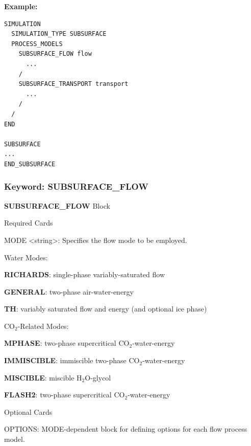\begin{mdframed}

{\bf Example:}
\footnotesize
\begin{verbatim}
SIMULATION
  SIMULATION_TYPE SUBSURFACE
  PROCESS_MODELS
    SUBSURFACE_FLOW flow
      ...
    /
    SUBSURFACE_TRANSPORT transport
      ...
    /
  /
END

SUBSURFACE
...
END_SUBSURFACE

\end{verbatim}
\end{mdframed}
\normalsize

\newpage
\subsubsection{Keyword: SUBSURFACE\_FLOW}
\begin{description}
\item {\bf SUBSURFACE\_FLOW} Block

\begin{description}
\item Required Cards
\item MODE <string>: Specifies the flow mode to be employed. 
\end{description}

\item Water Modes:

\begin{description}
\item {\bf RICHARDS}: single-phase variably-saturated flow
\item {\bf GENERAL}: two-phase air-water-energy
\item {\bf TH}: variably saturated flow and energy (and optional ice phase)
\end{description}

\item CO$_2$-Related Modes:

\begin{description}
\item {\bf MPHASE}: two-phase supercritical CO$_2$-water-energy
\item {\bf IMMISCIBLE}: immiscible two-phase CO$_2$-water-energy
\item {\bf MISCIBLE}: miscible H$_2$O-glycol
\item {\bf FLASH2}: two-phase supercritical CO$_2$-water-energy
\end{description}

\item Optional Cards
\item OPTIONS: MODE-dependent block for defining options for each flow process model.

\end{description}

